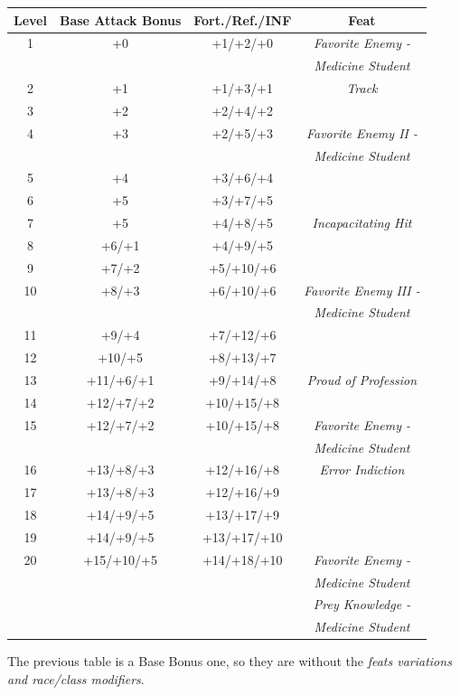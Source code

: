 \documentclass[ letterpaper,12pt]{article}
\begin{document}
\begin{center} \begin{tabular}{|c||c|c|c|}
\hline
{\bf Level}&{\bf Base Attack Bonus}&{\bf Fort./Ref./INF}&{\bf Feat}\\
\hline
1&+0&+1/+2/+0&{\it Favorite Enemy -}\\
&&&{\it Medicine Student}\\
\hline
2&+1&+1/+3/+1&{\it Track}\\
\hline
3&+2&+2/+4/+2&\\
\hline
4&+3&+2/+5/+3&{\it Favorite Enemy II -}\\
&&&{\it Medicine Student}\\
\hline
5&+4&+3/+6/+4&\\
\hline
6&+5&+3/+7/+5&\\
\hline
7&+5&+4/+8/+5&{\it Incapacitating Hit}\\
\hline
8&+6/+1&+4/+9/+5&\\
\hline
9&+7/+2&+5/+10/+6&\\
\hline
10&+8/+3&+6/+10/+6&{\it Favorite Enemy III -}\\
&&&{\it Medicine Student}\\
\hline
11&+9/+4&+7/+12/+6&\\
\hline
12&+10/+5&+8/+13/+7&\\
\hline
13&+11/+6/+1&+9/+14/+8&{\it Proud of Profession}\\
\hline
14&+12/+7/+2&+10/+15/+8&\\
\hline
15&+12/+7/+2&+10/+15/+8&{\it Favorite Enemy -}\\
&&&{\it Medicine Student}\\
\hline
16&+13/+8/+3&+12/+16/+8&{\it Error Indiction}\\
\hline
17&+13/+8/+3&+12/+16/+9&\\
\hline
18&+14/+9/+5&+13/+17/+9&\\
\hline
19&+14/+9/+5&+13/+17/+10&\\
\hline
20&+15/+10/+5&+14/+18/+10&{\it Favorite Enemy -}\\
&&&{\it Medicine Student}\\
&&&{\it Prey Knowledge - }\\
&&&{\it Medicine Student}\\
\hline
\end{tabular} \end{center}

The previous table is a Base Bonus one, so they are without the {\it feats variations and race/class modifiers}.\\
\end{document}
